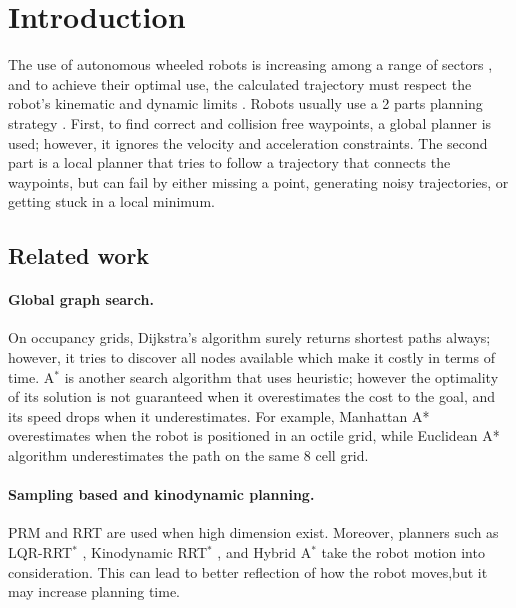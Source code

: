 
\section{Introduction}
\label{sec:intro}

The use of autonomous wheeled robots is increasing among a range of sectors \citep{luo2024otpwr,gao2018patrol}, and to achieve their optimal use, the calculated trajectory must respect the robot's kinematic and dynamic limits
\citep{lavalle2006planning}. Robots usually use a 2 parts planning strategy
\citep{marder2010office,paden2016survey}. First, to find correct and collision free waypoints, a global planner is used; however, it ignores the velocity and acceleration constraints. The second part is a local
planner that tries to follow a trajectory that connects the waypoints, but can fail by either missing a point, generating noisy trajectories, or getting stuck in a local minimum.

\subsection{Related work}
\label{sec:lit}

\paragraph{Global graph search.} On occupancy grids, Dijkstra's algorithm
\citep{dijkstra1959note} surely returns shortest paths always; however, it tries to discover all nodes available which make it costly in terms of time. A$^\ast$ \citep{hart1968formal} is another search algorithm that uses heuristic; however the optimality of its solution is not guaranteed when it overestimates the cost to the goal, and its speed drops when it underestimates. For example, Manhattan A* overestimates when the robot is positioned in an octile grid, while Euclidean A* algorithm underestimates the path on the same 8 cell grid.

\paragraph{Sampling based and kinodynamic planning.} PRM
\citep{kavraki1996probabilistic} and RRT \citep{lavalle1998rapidly} are used when
high dimension exist. Moreover, planners such as LQR-RRT$^\ast$ \citep{perez2012lqr},
Kinodynamic RRT$^\ast$ \citep{webb2013kinodynamic}, and Hybrid A$^\ast$
\citep{dolgov2010path} take the robot motion into consideration.
This can lead to better reflection of how the robot moves,but it
may increase planning time. 

